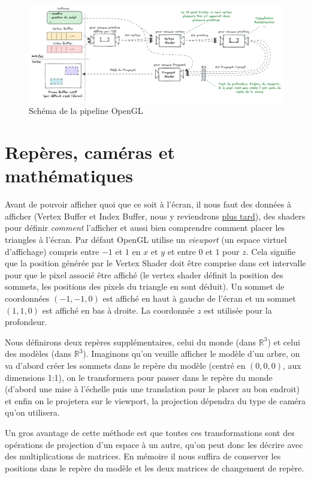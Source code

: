 \documentclass{EPUProjetDi}
\begin{document}
\begin{figure}[th]
	\centering
	\includegraphics[scale=.3]{opengl_pipeline}
	\caption{Schéma de la pipeline OpenGL}
	\label{fig:opengl_pipeline}
\end{figure}

\section{Repères, caméras et mathématiques}

Avant de pouvoir afficher quoi que ce soit à l'écran, il nous faut des données à afficher (Vertex Buffer et Index Buffer, nous y reviendrons \hyperref[sec:instanced_rendering]{plus tard}), des shaders pour définir \textit{comment} l'afficher et aussi bien comprendre comment placer les triangles à l'écran.
Par défaut OpenGL utilise un \textit{viewport} (un espace virtuel d'affichage) compris entre $-1$ et $1$ en $x$ et $y$ et entre $0$ et $1$ pour $z$. Cela signifie que la position générée par le Vertex Shader doit être comprise dans cet intervalle pour que le pixel associé être affiché (le vertex shader définit la position des sommets, les positions des pixels du triangle en sont déduit). Un sommet de coordonnées $(-1,-1,0)$ est affiché en haut à gauche de l'écran et un sommet $(1,1,0)$ est affiché en bas à droite. La coordonnée $z$ est utilisée pour la profondeur.
\par
Nous définirons deux repères supplémentaires, celui du monde (dans $\mathbb{R}^3$) et celui des modèles (dans $\mathbb{R}^3$). Imaginons qu'on veuille afficher le modèle d'un arbre, on va d'abord créer les sommets dans le repère du modèle (centré en $(0,0,0)$, aux dimensions 1:1), on le transformera pour passer dans le repère du monde (d'abord une mise à l'échelle puis une translation pour le placer au bon endroit) et enfin on le projetera sur le viewport, la projection dépendra du type de caméra qu'on utilisera.

Un gros avantage de cette méthode est que toutes ces transformations sont des opérations de projection d'un espace à un autre, qu'on peut donc les décrire avec des multiplications de matrices. En mémoire il nous suffira de conserver les positions dans le repère du modèle et les deux matrices de changement de repère.
\end{document}
